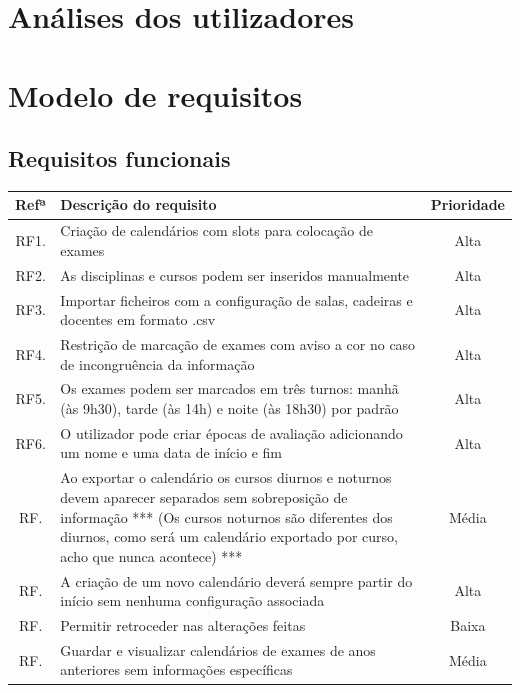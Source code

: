 \documentclass[11pt, twoside]{report}
\begin{document}
 	

	\chapter{Análises dos utilizadores}
	
	\chapter{Modelo de requisitos}
	\section{Requisitos funcionais}

	\pagebreak %
	\begin{center}
				\begin{tabularx}{\textwidth}{|c|X|c|}
				\hline
				\textbf{Refª }	& \textbf{Descrição do requisito} & \textbf{Prioridade} \\
				\hline
				RF1. & Criação de calendários com slots para colocação de exames & Alta \\
				\hline
				RF2. & As disciplinas e cursos podem ser inseridos manualmente & Alta\\
				\hline
				RF3. & Importar ficheiros com a configuração de salas, cadeiras e docentes em formato .csv & Alta \\
				\hline
				RF4. &  Restrição de marcação de exames com aviso a cor no caso de incongruência da informação & Alta \\
				\hline
				RF5. & Os exames podem ser marcados em três turnos: manhã (às 9h30), tarde (às 14h) e noite (às 18h30) por padrão & Alta \\
				\hline
				RF6. & O utilizador pode criar épocas de avaliação adicionando um nome e uma data de início e fim & Alta \\
				\hline
				RF. & Ao exportar o calendário os cursos diurnos e noturnos devem aparecer separados sem sobreposição de informação *** (Os cursos noturnos são diferentes dos diurnos, como será um calendário exportado por curso, acho que nunca acontece) *** & Média \\
				\hline
				RF. & A criação de um novo calendário deverá sempre partir do início sem nenhuma configuração associada & Alta\\
				\hline
				RF. & Permitir retroceder nas alterações feitas & Baixa \\
				\hline
				RF. & Guardar e visualizar calendários de exames de anos anteriores sem informações específicas  & Média \\

\end{tabularx}
\end{center}
\end{document}
